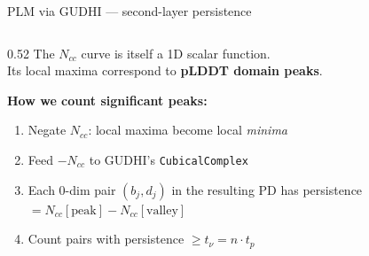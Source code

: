 \documentclass[aspectratio=169, 10pt]{beamer}
\begin{document}
\begin{frame}{PLM via GUDHI — second-layer persistence}
  \begin{columns}[T]
    \begin{column}{0.52\textwidth}
      The $N_{cc}$ curve is itself a 1D scalar function.\\
      Its local maxima correspond to \textbf{pLDDT domain peaks}.
      \vspace{6pt}

      \textbf{How we count significant peaks:}
      \begin{enumerate}
        \item Negate $N_{cc}$: local maxima become local \emph{minima}
        \item Feed $-N_{cc}$ to GUDHI's \texttt{CubicalComplex}
        \item Each 0-dim pair $(b_j, d_j)$ in the resulting PD has
              persistence $= N_{cc}[\text{peak}] - N_{cc}[\text{valley}]$
        \item Count pairs with persistence $\geq t_\nu = n \cdot t_p$
      \end{enumerate}
      \vspace{6pt}


\end{column}
\end{columns}
\end{frame}
\end{document}
